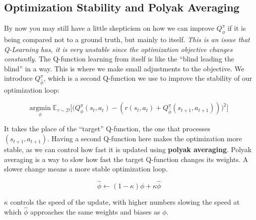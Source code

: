 \subsection{Optimization Stability and Polyak Averaging}
\begin{flushleft}
    \large By now you may still have a little skepticism on how we can improve $Q^\pi_\phi$ if it is being compared not to a ground truth, but mainly to itself. \textit{This is an issue that Q-Learning has, it is very unstable since the optimization objective changes constantly.} The Q-function learning from itself is like the ``blind leading the blind'' in a way. This is where we make small adjustments to the objective. We introduce $Q^\pi_{\hat{\phi}}$, which is a second Q-function we use to improve the stability of our optimization loop:

    $$\underset{\phi}{\mathrm{argmin}}\;\mathbb{E}_{\tau \sim \mathcal{D}}\biggl[\biggl(Q_\phi^\pi(s_t, a_t) - (r(s_t, a_t) + Q_{\hat{\phi}}^\pi(s_{t+1}, a_{t+1}))\biggr)^2\biggr]$$

    It takes the place of the ``target'' Q-function, the one that processes $(s_{t+1}, a_{t+1})$. Having a second Q-function here makes the optimization more stable, as we can control how fast it is updated using \textbf{polyak averaging}. Polyak averaging is a way to slow how fast the target Q-function changes its weights. A slower change means a more stable optimization loop.

    $$\hat{\phi} \leftarrow (1-\kappa)\phi + \kappa\hat{\phi}$$

    $\kappa$ controls the speed of the update, with higher numbers slowing the speed at which $\hat{\phi}$ approaches the same weights and biases as $\phi$.
\end{flushleft}
